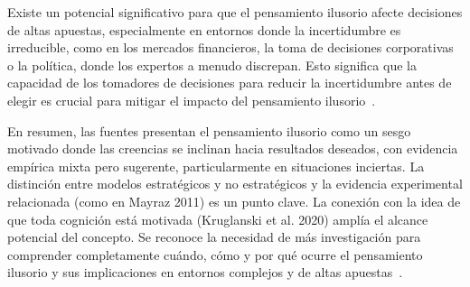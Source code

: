 \documentclass[12pt, a4paper, twoside]{article}
\begin{document}
Existe un potencial significativo para que el pensamiento ilusorio afecte decisiones de altas apuestas, especialmente en entornos donde la incertidumbre 
es irreducible, como en los mercados financieros, la toma de decisiones corporativas o la política, donde los expertos a menudo discrepan. Esto significa 
que la capacidad de los tomadores de decisiones para reducir la incertidumbre antes de elegir es crucial para mitigar el impacto del pensamiento ilusorio~\cite{mayraz2011wishful}.

En resumen, las fuentes presentan el pensamiento ilusorio como un sesgo motivado donde las creencias se inclinan hacia resultados deseados, con evidencia 
empírica mixta pero sugerente, particularmente en situaciones inciertas. La distinción entre modelos estratégicos y no estratégicos y la evidencia experimental 
relacionada (como en Mayraz 2011) es un punto clave. La conexión con la idea de que toda cognición está motivada (Kruglanski et al. 2020) amplía 
el alcance potencial del concepto. Se reconoce la necesidad de más investigación para comprender completamente cuándo, cómo y por qué ocurre el pensamiento 
ilusorio y sus implicaciones en entornos complejos y de altas apuestas~\cite{krizan2009wishful}.
\newpage
\end{document}
